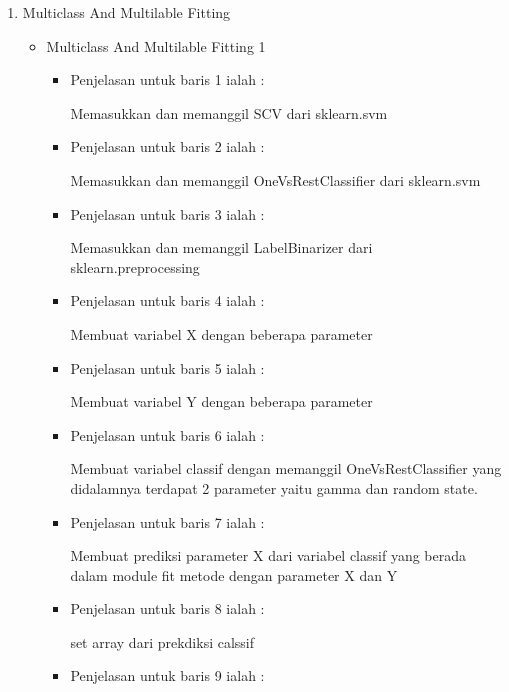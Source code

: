 \begin{enumerate}
\begin{itemize}
\begin{enumerate}
\par
\par
\par
\par
\par
\item Multiclass And Multilable Fitting
\par
\begin{itemize}
\item Multiclass And Multilable Fitting 1 
\begin{itemize}
\item Penjelasan untuk baris 1 ialah : 
\par Memasukkan dan memanggil SCV dari sklearn.svm
\par
\par
\item Penjelasan untuk baris 2 ialah :
\par Memasukkan dan memanggil OneVsRestClassifier dari sklearn.svm
\par
\item Penjelasan untuk baris 3  ialah :
\par Memasukkan dan memanggil LabelBinarizer dari sklearn.preprocessing
\par
\item Penjelasan untuk baris 4  ialah :
\par Membuat variabel X dengan beberapa parameter
\par
\item Penjelasan untuk baris 5  ialah :
\par Membuat variabel Y dengan beberapa parameter
\par
\item Penjelasan untuk baris 6 ialah :
\par Membuat variabel classif dengan memanggil OneVsRestClassifier yang didalamnya terdapat 2 parameter yaitu gamma dan random state.
\par
\item Penjelasan untuk baris 7 ialah : 
\par Membuat prediksi parameter X dari variabel classif yang berada dalam module fit metode dengan parameter X dan Y
\par
\par
\item Penjelasan untuk baris 8 ialah :
\par set array dari prekdiksi calssif
\par
\item Penjelasan untuk baris 9 ialah :

\end{itemize}
\end{itemize}
\end{enumerate}
\end{itemize}
\end{enumerate}

